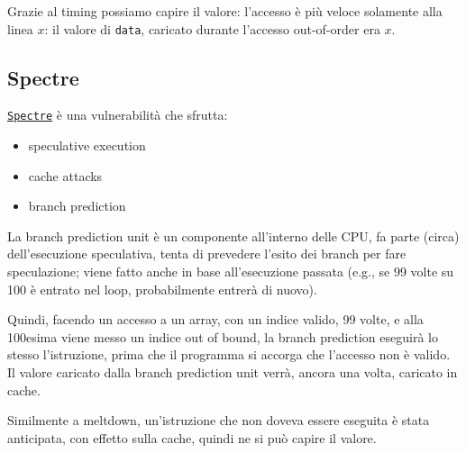 Grazie al timing possiamo capire il valore: l'accesso è più veloce solamente alla linea $x$: il valore di \texttt{data}, caricato durante l'accesso out-of-order era $x$.

\subsection{Spectre}

\href{https://spectreattack.com/spectre.pdf}{\texttt{Spectre}} è una vulnerabilità che sfrutta:
\begin{itemize}
	\item speculative execution
	
    \item cache attacks
	
    \item branch prediction
\end{itemize}

La branch prediction unit è un componente all'interno delle CPU, fa parte (circa) dell'esecuzione speculativa, tenta di prevedere l'esito dei branch per fare speculazione; viene fatto anche in base all'esecuzione passata (e.g., se 99 volte su 100 è entrato nel loop, probabilmente entrerà di nuovo).

Quindi, facendo un accesso a un array, con un indice valido, 99 volte, e alla 100esima viene messo un indice out of bound, la branch prediction eseguirà lo stesso l'istruzione, prima che il programma si accorga che l'accesso non è valido. Il valore caricato dalla branch prediction unit verrà, ancora una volta, caricato in cache.

Similmente a meltdown, un'istruzione che non doveva essere eseguita è stata anticipata, con effetto sulla cache, quindi ne si può capire il valore. 

